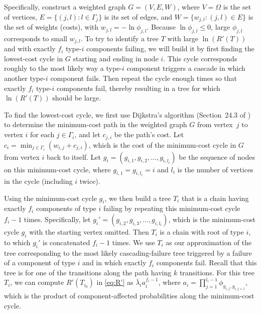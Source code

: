 \documentclass[12pt]{article}
\newcommand{\changed}[1]{#1}
\newcommand{\changed}[1]{\textcolor{red}{#1}}
\begin{document}
\changed{
Specifically,
construct a weighted graph
$G = (V,E,W)$,
where $V = \Omega$ is the set of
vertices, $E = \{ (j,l) : l \in \Gamma_j \}$
is its set of edges,
and $W = \{ w_{j,l} : (j,l) \in E \}$
is the set of weights (costs),
with $w_{j,l} = -\ln \phi_{j,l}$.
Because $\ln \phi_{j,l} \leq 0$,
large $\phi_{j,l}$ corresponds to
small $w_{j,l}$.
To try to identify a tree $T$ with large
$\ln(R'(T))$ and with exactly
$f_i$ type-$i$ components failing,
we will build it
by first finding the lowest-cost cycle
in $G$
starting and ending in node $i$.
This cycle
corresponds roughly to
the most likely way a type-$i$
component triggers
a cascade in which another type-$i$ component
fails.
Then repeat the cycle
enough times so that exactly
$f_{i}$ type-$i$
components fail, thereby resulting in a
tree
for which $\ln(R'(T))$ should
be large.
}

\changed{
To find the lowest-cost cycle,
we first
use Dijkstra's algorithm
(Section~24.3 of \cite{CLRS:2001})
to determine the minimum-cost path
in the
weighted graph $G$ from vertex~$j$
to vertex $i$ for each $j \in \Gamma_i$, 
and let $c_{j,i}$ be
the path's cost.
Let $c_{i} = \min_{j \in \Gamma_{i}}
(w_{i,j} + c_{j,i})$,
which is the cost of the
minimum-cost cycle in $G$ from vertex $i$
back to itself.
Let $g_{i} = (g_{i,1}, g_{i,2},
\dots, g_{i,l_{i}})$ be the sequence of
nodes on this minimum-cost cycle,
where $g_{i,1} = g_{i,l_{i}} = i$
and $l_{i}$ is the number
of vertices in the cycle
(including $i$ twice).}

\changed{
Using the minimum-cost cycle $g_{i}$,
we then build a tree $T_{i}$ that is
a chain having
exactly $f_{i}$
components of type $i$ failing
by repeating this minimum-cost cycle
$f_{i} - 1$ times.
Specifically, let $g_{i}' =
(g_{i,2}, g_{i,3}, \ldots, g_{i,l_{i}})$,
which is the minimum-cost cycle $g_{i}$
with the starting vertex omitted.
Then $T_{i}$ is a chain with root
of type $i$, to which $g_{i}'$
is concatenated
$f_{i} - 1$ times.
We use $T_{i}$ as
our approximation of
the tree corresponding to the
most likely cascading-failure tree
triggered by a failure of a
component of type $i$ and in which
exactly $f_{i}$ components fail.
Recall that this tree is for one of
the transitions along the path
having $k$ transitions.
For this tree $T_{i}$, we can compute
$R'(T_{i_0})$ in
\eqref{eq:R'} as $\bar{\lambda}_i
a_i^{f_i-1}$,
where
$a_i = \prod_{j=1}^{l_i-1}
\phi_{g_{i,j}, g_{i,j+1}}$,
which is the product of
component-affected probabilities
along the minimum-cost
cycle.
}
\end{document}
